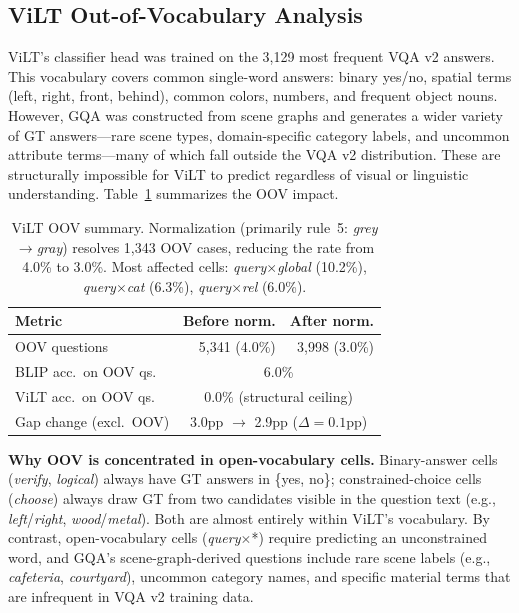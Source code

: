 \documentclass[11pt]{article}
\begin{document}
\subsection{ViLT Out-of-Vocabulary Analysis}

ViLT's classifier head was trained on the 3,129 most frequent VQA v2 answers. This vocabulary covers common single-word answers: binary yes/no, spatial terms (left, right, front, behind), common colors, numbers, and frequent object nouns. However, GQA was constructed from scene graphs and generates a wider variety of GT answers---rare scene types, domain-specific category labels, and uncommon attribute terms---many of which fall outside the VQA v2 distribution. These are structurally impossible for ViLT to predict regardless of visual or linguistic understanding. Table~\ref{tab:oov} summarizes the OOV impact.

\begin{table}[h]
\centering
\small
\begin{tabular}{lrr}
\toprule
\textbf{Metric} & \textbf{Before norm.} & \textbf{After norm.} \\
\midrule
OOV questions              & 5,341 (4.0\%)  & 3,998 (3.0\%) \\
BLIP acc.\ on OOV qs.      & \multicolumn{2}{c}{6.0\%} \\
ViLT acc.\ on OOV qs.      & \multicolumn{2}{c}{0.0\% (structural ceiling)} \\
Gap change (excl.\ OOV)    & \multicolumn{2}{c}{3.0pp $\to$ 2.9pp ($\Delta = 0.1$pp)} \\
\bottomrule
\end{tabular}
\caption{ViLT OOV summary. Normalization (primarily rule~5: \emph{grey}$\to$\emph{gray}) resolves 1,343 OOV cases, reducing the rate from 4.0\% to 3.0\%. Most affected cells: \textit{query}$\times$\textit{global} (10.2\%), \textit{query}$\times$\textit{cat} (6.3\%), \textit{query}$\times$\textit{rel} (6.0\%).}
\label{tab:oov}
\end{table}

\noindent\textbf{Why OOV is concentrated in open-vocabulary cells.} Binary-answer cells (\textit{verify}, \textit{logical}) always have GT answers in \{yes, no\}; constrained-choice cells (\textit{choose}) always draw GT from two candidates visible in the question text (e.g., \emph{left}/\emph{right}, \emph{wood}/\emph{metal}). Both are almost entirely within ViLT's vocabulary. By contrast, open-vocabulary cells (\textit{query}$\times$*) require predicting an unconstrained word, and GQA's scene-graph-derived questions include rare scene labels (e.g., \emph{cafeteria}, \emph{courtyard}), uncommon category names, and specific material terms that are infrequent in VQA v2 training data.
\end{document}
